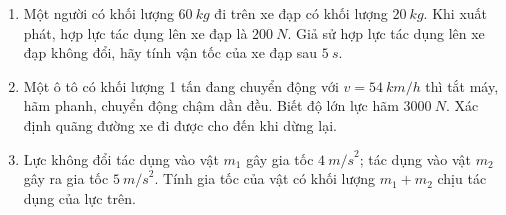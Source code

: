 \begin{enumerate}[label=\bfseries Bài \arabic*:,leftmargin=1.5cm]
{	}
	
	\item {}
	
	{
		
		Một người có khối lượng $\SI{60}{kg}$ đi trên xe đạp có khối lượng $\SI{20}{kg}$. Khi xuất phát, hợp lực tác dụng lên xe đạp là $\SI{200}{N}$. Giả sử hợp lực tác dụng lên xe đạp không đổi, hãy tính vận tốc của xe đạp sau $\SI{5}{s}$.
	}
	
	
	\item {}
	
	{
		
		Một ô tô có khối lượng 1 tấn đang chuyển động với $v = \SI{54}{km/h}$ thì tắt máy, hãm phanh, chuyển động chậm dần đều. Biết độ lớn lực hãm $\SI{3000}{N}$. Xác định quãng đường xe đi được cho đến khi dừng lại.
	}
	
	
	\item {}
	
	{
		
		Lực không đổi tác dụng vào vật $m_1$ gây gia tốc $\SI{4}{m/s}^2$; tác dụng vào vật $m_2$ gây ra gia tốc $\SI{5}{m/s}^2.$ Tính gia tốc của vật có khối lượng $m_1 + m_2$ chịu tác dụng của lực trên.
	}
	
\end{enumerate}
